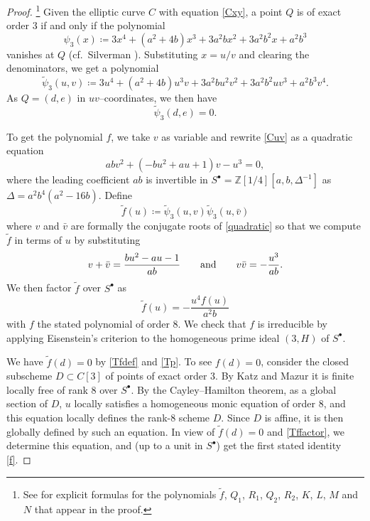 \documentclass[microtype]{gtpart}     %
\theoremstyle{remark}
\theoremstyle{definition}
\newcommand{\mb}[1]{\mathbb{#1}}
\newcommand{\BZ}{{\mb Z}}
\newcommand{\Tf}{\widetilde{f}}
\newcommand{\Tp}{\widetilde{\psi}}
\newcommand{\ad}{{\rm and}}
\newcommand{\ce}{\coloneqq}
\newcommand{\s}{S^\bullet}
\begin{document}
\begin{proof}
 \footnote{See  for explicit formulas for the polynomials 
 $\Tf$, $Q_1$, $R_1$, $Q_2$, $R_2$, $K$, $L$, $M$ and $N$ that appear in the 
 proof.  }
 Given the elliptic curve $C$ with equation \eqref{Cxy}, a point $Q$ is of 
 exact order 3 if and only if the polynomial 
 \[
  \psi_3 (x) \ce 3 x^4 + (a^2 + 4 b) x^3 + 3 a^2 b x^2 + 3 a^2 b^2 x + a^2 b^3 
 \]
 vanishes at $Q$ (cf.~Silverman \cite[Exercise 3.7f]{AEC}).  Substituting 
 $x = u/v$ and clearing the denominators, we get a polynomial 
 \[
  \Tp_3(u,v) \ce 3 u^4 + (a^2 + 4 b) u^3 v + 3 a^2 b u^2 v^2 + 3 a^2 b^2 u v^3 + a^2 b^3 v^4.  
 \]
 As $Q = (d,e)$ in $uv$--coordinates, we then have 
 \begin{equation}
 \label{Tp}
  \Tp_3(d,e) = 0.  
 \end{equation}

 To get the polynomial $f$, we take $v$ as variable and rewrite \eqref{Cuv} 
 as a quadratic equation 
 \begin{equation}
 \label{quadratic}
  a b v^2 + (-b u^2 + a u + 1) v - u^3 = 0, 
 \end{equation}
 where the leading coefficient $a b$ is invertible in 
 $\s = \BZ [1/4] [a, b, \Delta^{-1}]$ as $\Delta = a^2 b^4 (a^2 - 16 b)$.  
 Define 
 \begin{equation}
 \label{Tfdef}
  \Tf(u) \ce \Tp_3(u,v) \Tp_3(u,\bar{v}) 
 \end{equation}
 where $v$ and $\bar{v}$ are formally the conjugate roots of 
 \eqref{quadratic} so that we compute $\Tf$ in terms of $u$ by substituting 
 \[
  v + \bar{v} = \frac{b u^2 - a u - 1}{a b} \qquad \ad \qquad v \bar{v} = -\frac{u^3}{a b}.  
 \]
 We then factor $\Tf$ over $\s$ as 
 \begin{equation}
 \label{Tffactor}
  \Tf(u) = -\frac{u^4 f(u)}{a^2 b} 
 \end{equation}
 with $f$ the stated polynomial of order 8.  We check that $f$ is irreducible 
 by applying Eisenstein's criterion to the homogeneous prime ideal $(3,H)$ of 
 $\s$.  

 We have $\Tf(d) = 0$ by \eqref{Tfdef} and \eqref{Tp}.  To see $f(d) = 0$, 
 consider the closed subscheme $D \subset C[3]$ of points of exact order 3.  
 By Katz and Mazur \cite[Theorem 2.3.1]{KM} it is finite locally free of rank 
 8 over $\s$.  By the Cayley--Hamilton theorem, as a global section of $D$, 
 $u$ locally satisfies a homogeneous monic equation of order 8, and this 
 equation locally defines the rank-8 scheme $D$.  Since $D$ is affine, it is 
 then globally defined by such an equation.  In view of $\Tf(d) = 0$ and 
 \eqref{Tffactor}, we determine this equation, and (up to a unit in $\s$) get 
 the first stated identity \eqref{f}.  


\end{proof}
\end{document}
